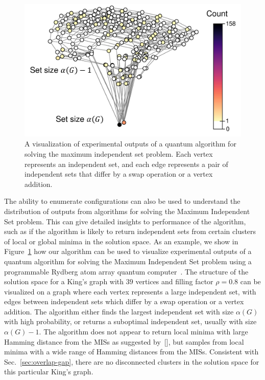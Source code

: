 \documentclass[onefignum, onetabnum]{siamart190516}
\newcommand{\<}{\langle}
\renewcommand{\>}{\rangle}
\newcommand{\blue}[1]{[{\bf  \color{blue}{JG: #1}}]}
\newcounter{example}
\begin{document}
\begin{figure} 
    \centering
    \includegraphics[width=.65\textwidth, trim={0cm 0cm 0cm 0cm}, clip]{figures/exp_configurations.pdf}
    \caption{A visualization of experimental outputs of a quantum algorithm for solving the maximum independent set problem.
    Each vertex represents an independent set, and each edge represents a pair of  independent sets that differ by a swap operation or a vertex addition.}
    \label{fig:exp_configuratoins}
\end{figure}
The ability to enumerate configurations can also be used to understand the distribution of outputs from algorithms for solving the Maximum Independent Set problem.
This can give detailed insights to performance of the algorithm, such as if the algorithm is likely to return independent sets from certain clusters of local or global minima in the solution space.
As an example, we show in Figure~\ref{fig:exp_configuratoins} how our algorithm can be used to visualize experimental outputs of a quantum algorithm for solving the Maximum Independent Set problem using a programmable Rydberg atom array quantum computer~\cite{Ebadi2022}.
The structure of the solution space for a King's graph with $39$ vertices and filling factor $\rho=0.8$ can be visualized on a graph where each vertex represents a large independent set, with edges between independent sets which differ by a swap operation or a vertex addition.
The algorithm either finds the largest independent set with size $\alpha(G)$ with high probability, or returns a suboptimal independent set, usually with size $\alpha(G)-1.$
The algorithm does not appear to return local minima with large Hamming distance from the MISs as suggested by~\cite{altshuler2010}\blue{Fix ref.},
but samples from local minima with a wide range of Hamming distances from the MISs.
Consistent with Sec.~\ref{sec:overlap-gap}, there are no disconnected clusters in the solution space for this particular King's graph.
\end{document}
